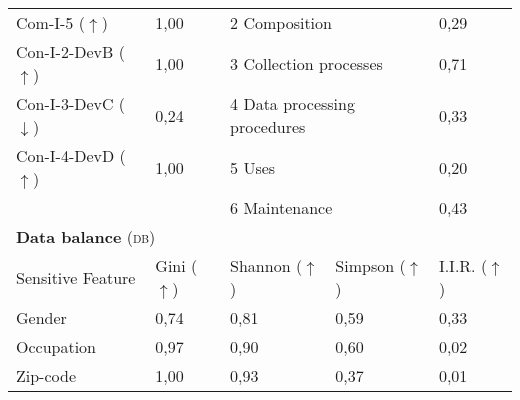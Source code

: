 \begin{table}[h]
\begin{tabular}{|p{3cm}|p{1.9cm}p{3cm}p{2.6cm}p{1.6cm}|}
        Com-I-5 ($\uparrow$) & 1,00\cellcolor[HTML]{FFFFFF} & \multicolumn{2}{|l|}{2 Composition} & 0,29\cellcolor[HTML]{FCB19A} \\
        Con-I-2-DevB ($\uparrow$) & 1,00\cellcolor[HTML]{FEFEFE} & \multicolumn{2}{|l|}{3 Collection processes} & 0,71\cellcolor[HTML]{FEDFD6} \\
        Con-I-3-DevC ($\downarrow$) & 0,24\cellcolor[HTML]{FEE4DD} & \multicolumn{2}{|l|}{4 Data processing procedures} & 0,33\cellcolor[HTML]{FDB6A0} \\
        Con-I-4-DevD ($\uparrow$) & 1,00\cellcolor[HTML]{FFFFFF} & \multicolumn{2}{|l|}{5 Uses} & 0,20\cellcolor[HTML]{FCA78E} \\ 
         & & \multicolumn{2}{|l|}{6 Maintenance} & 0,43\cellcolor[HTML]{FDC0AE} \\ \hline
        \multicolumn{5}{|l|}{\textbf{Data balance} (\textsc{db})} \\ \hline 
 		Sensitive Feature & Gini ($\uparrow$) & Shannon ($\uparrow$) & Simpson ($\uparrow$) & I.I.R. ($\uparrow$) \\ \hline
        Gender & 0,74 & 0,81 & 0,59 & 0,33 \\
		Occupation & 0,97 & 0,90 & 0,60 & 0,02\cellcolor[HTML]{fc8d59} \\
		Zip-code & 1,00 & 0,93 & 0,37 & 0,01\cellcolor[HTML]{fc8d59} \\
		 \hline
    \end{tabular}
\end{table}